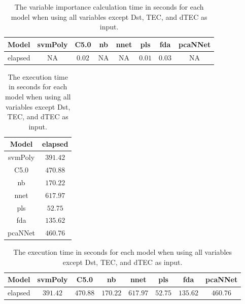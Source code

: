 \begin{table}[!ht]
	\centering
	\begin{tabular}{|c|c|c|c|c|c|c|c|}
		\hline
		Model & svmPoly & C5.0 & nb & nnet & pls & fda & pcaNNet \\ \hline
		elapsed & NA & $0.02$ & NA & NA & $0.01$ & $0.03$ & NA \\ \hline
	\end{tabular}
	\caption{The variable importance calculation time in seconds for each model when using all variables except Dst, TEC, and dTEC as input.}
	\label{tab:time:reverse:noTEC:importance}
\end{table}

\begin{table}[!ht]
	\centering
	\begin{tabular}{|c|c|}
		\hline
		Model & elapsed \\ \hline
		svmPoly & $391.42$ \\ \hline
		C5.0 & $470.88$ \\ \hline
		nb & $170.22$ \\ \hline
		nnet & $617.97$ \\ \hline
		pls & $52.75$ \\ \hline
		fda & $135.62$ \\ \hline
		pcaNNet & $460.76$ \\ \hline
	\end{tabular}
	\caption{The execution time in seconds for each model when using all variables except Dst, TEC, and dTEC as input.}
	\label{tab:time:noTEC:total}
\end{table}

\begin{table}[!ht]
	\centering
	\begin{tabular}{|c|c|c|c|c|c|c|c|}
		\hline
		Model & svmPoly & C5.0 & nb & nnet & pls & fda & pcaNNet \\ \hline
		elapsed & $391.42$ & $470.88$ & $170.22$ & $617.97$ & $52.75$ & $135.62$ & $460.76$ \\ \hline
	\end{tabular}
	\caption{The execution time in seconds for each model when using all variables except Dst, TEC, and dTEC as input.}
	\label{tab:time:reverse:noTEC:total}
\end{table}

